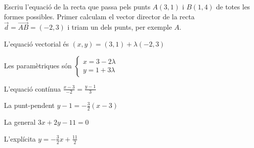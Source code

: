 \begin{resolt}{Escriu l'equació de la recta que passa pels punts $A(3,1)$ i $B(1,4)$ de totes les formes possibles.}
	Primer calculam el vector director de la recta $\vec d = \overrightarrow{AB}=(-2,3)$ i triam un dels punts, per exemple $A$.\vspace{0.25cm}
	
	L'equació vectorial és $(x,y)=(3,1)+\lambda(-2,3)$
	
	Les paramètriques són $\left\{ \begin{array}{l} x=3-2\lambda \\ y=1+3\lambda \end{array} \right.$
	
	L'equació contínua $\frac{x-3}{-2}=\frac{y-1}{3}$
	
	La punt-pendent $y-1 = -\frac{3}{2}(x-3)$
	
	La general $3x+2y-11=0$
	
	L'explícita $y=-\frac{3}{2}x+\frac{11}{2}$
	
\end{resolt}


